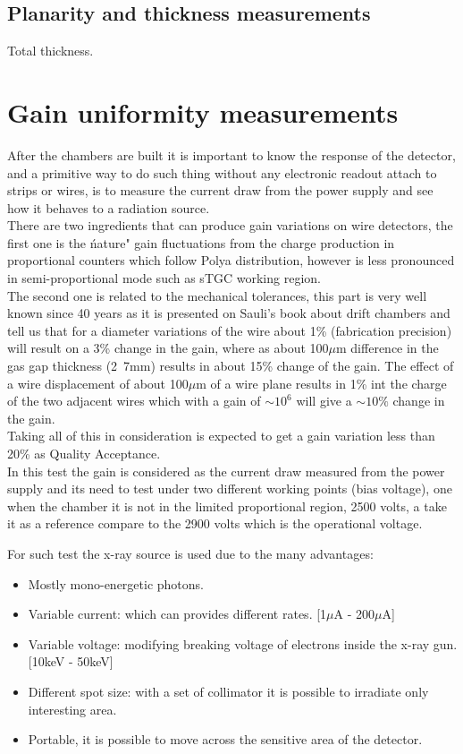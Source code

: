 \subsection{Planarity and thickness measurements}
Total thickness.

\section{Gain uniformity measurements}

After the chambers are built it is important to know the response of the detector, and a primitive way to do such thing without any electronic readout attach
to strips or wires, is to measure the current draw from the power supply and see how it behaves to a radiation source.\\ There are two ingredients that can
produce gain variations on wire detectors, the first one is the \'nature" gain fluctuations from the charge production in proportional counters which follow
Polya distribution, however is less pronounced in semi-proportional mode such as sTGC working region.\\ The second one is related to the mechanical tolerances,
this part is very well known since 40 years as it is presented on Sauli's book about drift chambers and tell us that for a diameter variations of the wire about
1\% (fabrication precision) will result on a 3\% change in the gain, where as about \unit{100}{$\mu$m} difference in the gas gap thickness (\unit{2.7}{mm})
results in about 15\% change of the gain. The effect of a wire displacement of about \unit{100}{$\mu$m} of a wire plane results in 1\% int the charge of the two
adjacent wires which with a gain of $\sim10^6$ will give a $\sim10\%$ change in the gain.\\ Taking all of this in consideration is expected to get a gain variation less
than 20\% as Quality Acceptance.\\ In this test the gain is considered as the current draw measured from the power supply and its need to test under two
different working points (bias voltage), one when the chamber it is not in the limited proportional region, 2500 volts, a take it as a reference compare to the
2900 volts which is the operational voltage.\par

For such test the x-ray source is used due to the many advantages:\par
\begin{itemize}[noitemsep, topsep=0pt, parsep=0pt, partopsep=2pt]
	\item Mostly mono-energetic photons.
	\item Variable current: which can provides different rates. [\unit{1}{$\mu$A} - \unit{200}{$\mu$A}]
	\item Variable voltage: modifying breaking voltage of electrons inside the x-ray gun. [\unit{10}{keV} - \unit{50}{keV}]
	\item Different spot size: with a set of collimator it is possible to irradiate only interesting area.
	\item Portable, it is possible to move across the sensitive area of the detector.
\end{itemize}


